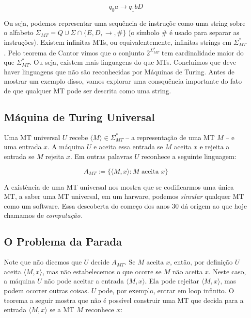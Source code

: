 \begin{displaymath}
  q_0 a \to q_1 b D
\end{displaymath}

Ou seja, podemos representar uma sequência de instruçõe como uma string sobre o alfabeto $\Sigma_{MT} = Q \cup \Sigma \cap \{E, D, \to, \#\}$ (o símbolo $\#$ é usado para separar as instruções).
Existem infinitas MTs, ou equivalentemente, infinitas strings em $\Sigma_{MT}^*$.
Pelo teorema de Cantor vimos que o conjunto $2^{\Sigma_{MT}^*}$ tem cardinalidade maior do que $\Sigma_{MT}^*$.
Ou seja, existem mais linguagens do que MTs.
Concluímos que deve haver linguagens que não são reconhecidas por Máquinas de Turing.
Antes de mostrar um exemplo disso, vamos explorar uma consquência importante do fato de que qualquer MT pode ser descrita como uma string.

\subsection*{Máquina de Turing Universal}

Uma MT universal $U$ recebe $\langle M \rangle \in \Sigma_{MT}^*$ -- a representação de uma MT $M$ -- e uma entrada $x$.
A máquina $U$ e aceita essa entrada se $M$ aceita $x$ e rejeita a entrada se $M$ rejeita $x$.
Em outras palavras $U$ reconhece a seguinte linguagem:

\begin{displaymath}
A_{MT} := \{\langle M, x \rangle  : M \textrm{ aceita } x\} 
\end{displaymath}

A existência de uma MT universal nos mostra que se codificarmos uma única MT, a saber uma MT universal, em um harware, podemos {\em simular} qualquer MT como um software.
Essa descoberta do começo dos anos 30 dá origem ao que hoje chamamos de {\em computação}.


\subsection*{O Problema da Parada}

Note que não dicemos que $U$ decide $A_{MT}$.
Se $M$ aceita $x$, então, por definição $U$ aceita $\langle M, x\rangle$, mas não estabelecemos o que ocorre se $M$ não aceita $x$.
Neste caso, a máquina $U$ não pode aceitar a entrada $\langle M, x \rangle$.
Ela pode rejeitar $\langle M, x \rangle$, mas podem ocorrer outras coisas.
$U$ pode, por exemplo, entrar em loop infinito.
O teorema a seguir mostra que não é possível construir uma MT que decida para a entrada $\langle M, x \rangle$ se a MT $M$ reconhece $x$:

